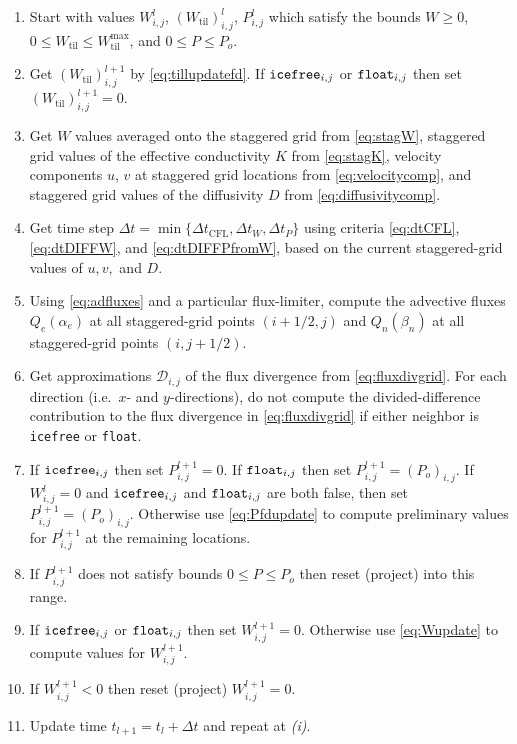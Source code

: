 \documentclass[gmd]{copernicus}   %
\newcommand{\text}{\textrm}
\newcommand{\Wtil}{W_{\text{til}}}
\newcommand{\Wtilmax}{W_{\text{til}}^{\text{max}}}
\newcommand{\Wlij}{W^l_{i,j}}
\newcommand{\Plij}{P^l_{i,j}}
\begin{document}
\renewcommand{\labelenumi}{\emph{(\roman{enumi})}}
\begin{enumerate}
\item Start with values $\Wlij$, $(\Wtil)_{i,j}^l$, $\Plij$ which satisfy the bounds $W\ge 0$, $0\le \Wtil \le \Wtilmax$, and $0 \le P \le P_o$.
\item Get $(\Wtil)_{i,j}^{l+1}$ by \eqref{eq:tillupdatefd}.  If $\text{\texttt{icefree}}_{i,j}$ or $\text{\texttt{float}}_{i,j}$ then set $(\Wtil)_{i,j}^{l+1}=0$.
\item Get $W$ values averaged onto the staggered grid from \eqref{eq:stagW}, staggered grid values of the effective conductivity $K$ from \eqref{eq:stagK}, velocity components $u$, $v$ at staggered grid locations from \eqref{eq:velocitycomp}, and staggered grid values of the diffusivity $D$ from \eqref{eq:diffusivitycomp}.
\item Get time step $\Delta t = \min\{\Delta t_{\text{CFL}}, \Delta t_W, \Delta t_P\}$ using criteria \eqref{eq:dtCFL}, \eqref{eq:dtDIFFW}, and \eqref{eq:dtDIFFPfromW}, based on the current staggered-grid values of $u,v,$ and $D$.
\item Using \eqref{eq:adfluxes} and a particular flux-limiter, compute the advective fluxes $Q_e(\alpha_e)$ at all staggered-grid points $(i+1/2,j)$ and $Q_n(\beta_n)$ at all staggered-grid points $(i,j+1/2)$.
\item Get approximations $\mathcal{D}_{i,j}$ of the flux divergence from \eqref{eq:fluxdivgrid}.  For each direction (i.e.~$x$- and $y$-directions), do not compute the divided-difference contribution to the flux divergence in \eqref{eq:fluxdivgrid} if either neighbor is \texttt{icefree} or \texttt{float}.
\item If $\text{\texttt{icefree}}_{i,j}$ then set $P_{i,j}^{l+1}=0$.  If $\text{\texttt{float}}_{i,j}$ then set $P_{i,j}^{l+1} = (P_o)_{i,j}$.  If $\Wlij=0$ and $\text{\texttt{icefree}}_{i,j}$ and $\text{\texttt{float}}_{i,j}$ are both false, then set $P_{i,j}^{l+1} = (P_o)_{i,j}$.  Otherwise use \eqref{eq:Pfdupdate} to compute preliminary values for $P_{i,j}^{l+1}$ at the remaining locations.
\item If $P_{i,j}^{l+1}$ does not satisfy bounds $0 \le P \le P_o$ then reset (project) into this range.
\item If $\text{\texttt{icefree}}_{i,j}$ or $\text{\texttt{float}}_{i,j}$ then set $W_{i,j}^{l+1}=0$.  Otherwise use \eqref{eq:Wupdate} to compute values for $W_{i,j}^{l+1}$.
\item If $W_{i,j}^{l+1}<0$ then reset (project) $W_{i,j}^{l+1}=0$.
\item Update time $t_{l+1}=t_l+\Delta t$ and repeat at \emph{(i)}.
\end{enumerate}
\end{document}
